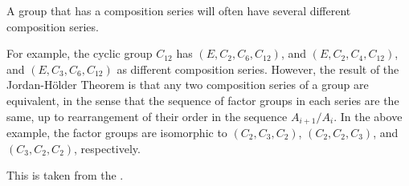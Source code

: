 \documentclass[12pt]{article}
\begin{document}

A group that has a composition series will often have several different composition series.

For example, the cyclic group $C_{12}$ has $(E, C_2, C_6, C_{12})$, and  $(E, C_2, C_4, C_{12})$, and $(E, C_3, C_6, C_{12})$ as different composition series. 
However, the result of the Jordan-H\"older Theorem is that any two composition series of a group are equivalent, in the sense that the sequence of factor groups in each series are the same, up to rearrangement of their order in the sequence $A_{i+1} / A_i$. In the above example, the factor groups are isomorphic to $(C_2, C_3, C_2)$, $(C_2, C_2, C_3)$, and $(C_3, C_2, C_2)$, respectively.

This is taken from the .
\end{document}
